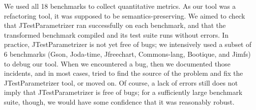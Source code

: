 

We used all 18 benchmarks to collect quantitative
metrics. As our tool was a refactoring tool, it was supposed to be
semantics-preserving. We aimed to check that JTestParametrizer ran
successfully on each benchmark, and that the transformed benchmark
compiled and its test suite runs without errors.  In practice,
JTestParametrizer is not yet free of bugs; we intensively used a
subset of 6 benchmarks (Gson, Joda-time, Jfreechart, Commons-lang,
Bootique, and Jimfs) to debug our tool.  When we encountered a bug,
then we documented those incidents, and in most cases, tried to find
the source of the problem and fix the JTestParametrizer tool, or moved
on. Of course, a lack of errors still does not imply that
JTestParametrizer is free of bugs; for a sufficiently large benchmark suite,
though, we would have some confidence that it was reasonably robust.

